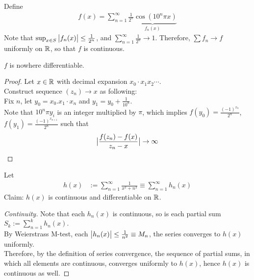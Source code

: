 \documentclass[11pt]{article}
\begin{document}
 	\begin{example}
 		Define
 		\begin{align}
 			f(x) = \sum_{n=1}^\infty \underbrace{\frac{1}{2^n} \cos(10^n \pi x)}_{f_n(x)}
 		\end{align}
 		Note that $\sup_{x \in S} \big \vert {f_n(x)} \big \vert \leq \frac{1}{2^n}$, and $\sum_{n=1}^\infty \frac{1}{2^n} \to 1$. Therefore, $\sum f_n \to f$ uniformly on $\mathbb{R}$, so that $f$ is continuous.
 	\end{example}
 	\begin{proposition}
 		$f$ is nowhere differentiable.
 	\end{proposition}
 	\begin{proof}
 		Let $x \in \mathbb{R}$ with decimal expansion $x_0\cdot x_1 x_2 \cdots$. \\
 		Construct sequence $(z_n) \to x$ as following: \\
		Fix $n$, let $y_0 = x_0.x_1 \cdot x_n$ and $y_1 = y_0 + \frac{1}{10^n}$. \\
		Note that $10^n \pi y_i$ is an integer multiplied by $\pi$, which implies $f(y_0) = \frac{(-1)^{x_n}}{2^n}$, $f(y_1) = \frac{(-1)^{x_{n+1}}}{2^n}$
 		such that
 		\begin{align}
 			\big \vert {\frac{f(z_n) - f(x)}{z_n - x}} \big \vert \to \infty
 		\end{align}
 	\end{proof}
 	
 	\begin{example}
 		Let
 		\begin{align}
 			h(x) &:= \sum_{n=1}^\infty \frac{1}{x^2 + n^2} \equiv \sum_{n=1}^\infty h_n(x)
 		\end{align}
 		Claim: $h(x)$ is continuous and differentiable on $\mathbb{R}$.
 	\end{example}
 	
 	\begin{proof}[Continuity]
 		Note that each $h_n(x)$ is continuous, so is each partial sum $S_k := \sum_{n=1}^k h_n(x)$. \\
 		By Weierstrass M-test, each $\big \vert {h_n(x)} \big \vert \leq \frac{1}{n^2} \equiv M_n$, the series converges to $h(x)$ uniformly. \\
 		Therefore, by the definition of series convergence, the sequence of partial sums, in which all elements are continuous, converges uniformly to $h(x)$, hence $h(x)$ is continuous as well. 
 	\end{proof}
 	
\end{document}
